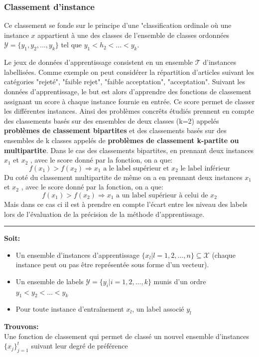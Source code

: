 \documentclass[a4paper,12pt,openany,oneside]{article}
\begin{document}
  \subsubsection{Classement d'instance}
  Ce classement se fonde sur le principe d'une \textbf'{classification ordinale} où une instance $x$ appartient à une des classes de l'ensemble de classes ordonnées $\mathcal{Y}=\{y_1,y_2,...,y_k\}$ tel que $y_1<h_2<...<y_k$.
  
 Le jeux de données d'apprentissage consistent en un ensemble $\mathcal{T}$ d'instances labellisées. Comme exemple on peut considérer la répartition d'articles suivant les catégories "rejeté", "faible rejet", "faible acceptation", "acceptation".
 Suivant les données d'apprentissage, le but est alors d'apprendre des fonctions de classement assignant un score à chaque instance fournie en entrée. Ce score permet de classer les différentes instances.
 Ainsi des problèmes concrêts étudiés prennent en compte des classements basés sur des ensembles de deux classes (k=2) appelés \textbf{problèmes de classement bipartites} et des classements basés sur des ensembles de k classes appelés de \textbf{problèmes de classement k-partite ou multipartite}.
 Dans le cas des classements bipartites, en prennant deux instances $x_1$ et $x_2$ , avec le score donné par la fonction, on a que:
 \[
 f(x_1)>f(x_2)\Rightarrow x_1\text{ a le label supérieur et }x_2\text{ le label inférieur}
 \]
 Du coté du classement multipartite de même on a en prennant deux instances $x_1$ et $x_2$ , avec le score donné par la fonction, on a que:
  \[
  f(x_1)>f(x_2)\Rightarrow x_1\text{ a un label supérieur à celui de }x_2
  \] 
  Mais dans ce cas ci il est à prendre en compte l'écart entre les niveau des labels lors de l'évaluation de la précision de la méthode d'apprentissage.
  
  \noindent \rule{\textwidth}{1pt}
  
 \textbf{Soit:}
 \begin{itemize}
 	\item Un ensemble d'instances d'apprentissage $\{x_l| l=1,2,...,n\}\subseteq \mathcal{X}$ (chaque instance peut ou pas être représentée sous forme d'un vecteur).
 	\item Un ensemble de labels $\mathcal{Y}=\{y_i|i=1,2,...,k\}$ munis d'un ordre $y_1<y_2<...<y_k$
 	\item Pour toute instance d'entraînement $x_l$, un label associé $y_l$
 \end{itemize}
  \textbf{Trouvons:}\\
  Une fonction de classement qui permet de classé un nouvel ensemble d'instances $\{x_j\}_{j=1}^t$ suivant leur degré de préférence\\
  
\end{document}
